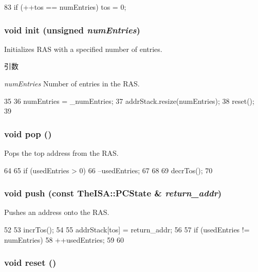\begin{DoxyCode}
83     { if (++tos == numEntries) tos = 0; }
\end{DoxyCode}
\hypertarget{classReturnAddrStack_a3de058721f5a8bb18c22178bac0af88d}{
\subsubsection[{init}]{\setlength{\rightskip}{0pt plus 5cm}void init (unsigned {\em numEntries})}}
\label{classReturnAddrStack_a3de058721f5a8bb18c22178bac0af88d}
Initializes RAS with a specified number of entries. 
\begin{DoxyParams}{引数}
\item[{\em numEntries}]Number of entries in the RAS. \end{DoxyParams}



\begin{DoxyCode}
35 {
36      numEntries  = _numEntries;
37      addrStack.resize(numEntries);
38      reset();
39 }
\end{DoxyCode}
\hypertarget{classReturnAddrStack_a312e7f6c761a199c1369fbe651e084f0}{
\subsubsection[{pop}]{\setlength{\rightskip}{0pt plus 5cm}void pop ()}}
\label{classReturnAddrStack_a312e7f6c761a199c1369fbe651e084f0}
Pops the top address from the RAS. 


\begin{DoxyCode}
64 {
65     if (usedEntries > 0) {
66         --usedEntries;
67     }
68 
69     decrTos();
70 }
\end{DoxyCode}
\hypertarget{classReturnAddrStack_a17169cc45efa4884c3af6dc4fbf95bf5}{
\subsubsection[{push}]{\setlength{\rightskip}{0pt plus 5cm}void push (const TheISA::PCState \& {\em return\_\-addr})}}
\label{classReturnAddrStack_a17169cc45efa4884c3af6dc4fbf95bf5}
Pushes an address onto the RAS. 


\begin{DoxyCode}
52 {
53     incrTos();
54 
55     addrStack[tos] = return_addr;
56 
57     if (usedEntries != numEntries) {
58         ++usedEntries;
59     }
60 }
\end{DoxyCode}
\hypertarget{classReturnAddrStack_ad20897c5c8bd47f5d4005989bead0e55}{
\subsubsection[{reset}]{\setlength{\rightskip}{0pt plus 5cm}void reset ()}}
\label{classReturnAddrStack_ad20897c5c8bd47f5d4005989bead0e55}



